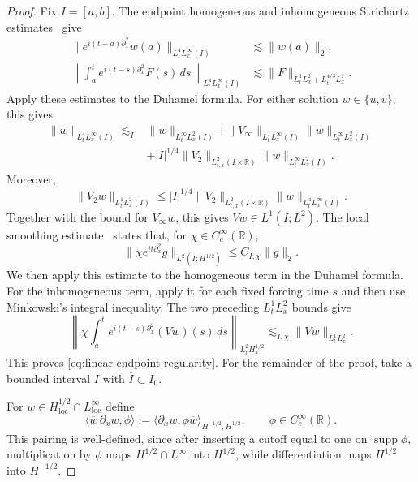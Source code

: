\documentclass[11pt]{amsart}
\theoremstyle{remark}
\newcommand{\R}{\mathbb R}
\newcommand{\supp}{\operatorname{supp}}
\newcommand{\1}{\mathbf 1}
\newcommand{\loc}{\mathrm{loc}}
\begin{document}
\begin{proof}
Fix $I=[a,b]$. The endpoint homogeneous and inhomogeneous
Strichartz estimates~\cite{KeelTao} give
\begin{align*}
 \|e^{i(t-a)\partial_x^2}w(a)\|_{L^4_tL^\infty_x(I)}
 &\lesssim\|w(a)\|_2,\\
 \left\|\int_a^t e^{i(t-s)\partial_x^2}F(s)\,ds
 \right\|_{L^4_tL^\infty_x(I)}
 &\lesssim\|F\|_{L^1_tL^2_x+L^{4/3}_tL^1_x}.
\end{align*}
Apply these estimates to the Duhamel formula.  For either solution $w \in \{u,v\}$, this
gives
\begin{align*}
 \|w\|_{L^4_tL^\infty_x(I)}
 \lesssim_I{}&\|w\|_{L^\infty_tL^2_x(I)}
 +\|V_\infty\|_{L^1_tL^\infty_x(I)}
       \|w\|_{L^\infty_tL^2_x(I)}\\
 &+|I|^{1/4}\|V_2\|_{L^2_{t,x}(I\times\R)}
       \|w\|_{L^\infty_tL^2_x(I)}.
\end{align*}
Moreover,
\[
 \|V_2w\|_{L^1_tL^2_x(I)}
 \le |I|^{1/4}\|V_2\|_{L^2_{t,x}(I\times\R)}
                  \|w\|_{L^4_tL^\infty_x(I)}.
\]
Together with the bound for $V_\infty w$, this gives $Vw\in L^1(I;L^2)$.
The local smoothing estimate~\cite{Vega,VegaVisciglia} states that, for
$\chi\in C_c^\infty(\R)$,
\[
 \|\chi e^{it\partial_x^2}g\|_{L^2(I;H^{1/2})}
 \le C_{I,\chi}\|g\|_2.
\]
We then apply this estimate to the homogeneous term in the Duhamel formula.  For the
inhomogeneous term, apply it for each fixed forcing time $s$ and then use
Minkowski's integral inequality.  The two preceding $L^1_tL^2_x$ bounds give
\[
 \left\|\chi\int_a^t e^{i(t-s)\partial_x^2}(Vw)(s)\,ds
 \right\|_{L^2_tH^{1/2}_x}
 \lesssim_{I,\chi}\|Vw\|_{L^1_tL^2_x}.
\]
This proves \eqref{eq:linear-endpoint-regularity}.  For the remainder of the
proof, take a bounded interval $I$ with $\overline I\subset I_0$.

For $w\in H^{1/2}_{\loc}\cap L^\infty_{\loc}$ define
\[
 \langle\overline w\,\partial_xw,\phi\rangle
 :=\langle\partial_xw,\phi\overline w\rangle_{H^{-1/2},H^{1/2}},
 \qquad \phi\in C_c^\infty(\R).
\]
This pairing is well-defined, since after inserting a cutoff equal to one on
$\supp\phi$, multiplication by $\phi$ maps
$H^{1/2}\cap L^\infty$ into $H^{1/2}$, while differentiation maps
$H^{1/2}$ into $H^{-1/2}$. 


\end{proof}
\end{document}
